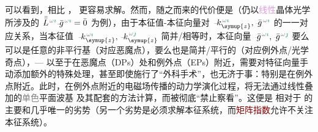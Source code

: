 可以看到，相比 ，  更容易求解。然而，随之而来的代价便是（仍以\textcolor{Plum}{线性}\textcolor{PineGreen}{晶体光学}所涉及的 $\xint{\mathcolor{gray}{-}}{30}{\bar{\bar{L}}}^{\;\! \mathcolor{gray}{\omega} \textcolor{PineGreen}{\imath}} \xint{{}^{}_{\mathcolor{gray}{-}}}{10}{\bar{g}}^{\;\!\mathcolor{gray}{\omega} \textcolor{PineGreen}{\imath}} = \bar{0}$ 为例），由于\textcolor{PineGreen}{本征值}-\textcolor{PineGreen}{本征向量}对 $\xint{\begin{smallmatrix} ~ \\ {}^{}_{\mathcolor{gray}{-}} \\ ~ \end{smallmatrix}}{15}{k}_{\symup{z}}^{\;\! \mathcolor{gray}{\omega} \textcolor{PineGreen}{\imath}}, \xint{{}^{}_{\mathcolor{gray}{-}}}{10}{\bar{g}}^{\;\!\mathcolor{gray}{\omega} \textcolor{PineGreen}{\imath}}$ 的一一对应关系，当\textcolor{PineGreen}{本征值} $\xint{\begin{smallmatrix} ~ \\ {}^{}_{\mathcolor{gray}{-}} \\ ~ \end{smallmatrix}}{15}{k}_{\symup{z}}^{\;\! \mathcolor{gray}{\omega} \textcolor{PineGreen}{\imath}}, \xint{\begin{smallmatrix} ~ \\ {}^{}_{\mathcolor{gray}{-}} \\ ~ \end{smallmatrix}}{15}{k}_{\symup{z}}^{\;\! \mathcolor{gray}{\omega} \textcolor{PineGreen}{\jmath}}$ 简并/相等时，\textcolor{PineGreen}{本征向量} $\xint{{}^{}_{\mathcolor{gray}{-}}}{10}{\bar{g}}^{\;\!\mathcolor{gray}{\omega} \textcolor{PineGreen}{\imath}}, \xint{{}^{}_{\mathcolor{gray}{-}}}{10}{\bar{g}}^{\;\!\mathcolor{gray}{\omega} \textcolor{PineGreen}{\jmath}}$ 要么可以是任意的非平行基（对应\textcolor{PineGreen}{恶魔点}），要么也是简并/平行的（对应\textcolor{PineGreen}{例外点}/\textcolor{PineGreen}{光学奇点}），--- 以至于在\textcolor{PineGreen}{恶魔点}（\textcolor{PineGreen}{DPs}）处和\textcolor{PineGreen}{例外点}（\textcolor{PineGreen}{EPs}）附近，需要对\textcolor{PineGreen}{特征向量}手动添加额外的特殊处理，甚至即使施行了“外科手术”，也无济于事：特别是在\textcolor{PineGreen}{例外点}附近。此时，在\textcolor{PineGreen}{例外点}附近的电磁场传播的动力学演化过程，将无法通过\textcolor{PineGreen}{线性叠加}的\textcolor{gray}{单色}\textcolor{PineGreen}{平面波基}  及其配套的方法计算，而被彻底“禁止察看”。这便是  相对于  的主要和几乎唯一的劣势（另一个劣势是必须求解\textcolor{PineGreen}{本征系统}，而\textcolor{Maroon}{矩阵指数}允许不关注\textcolor{PineGreen}{本征系统}\cite{zarifiPlaneWaveReflection2014}）。


